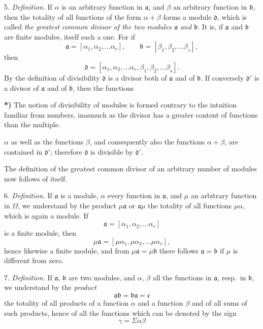 \documentclass{article}
\begin{document}
5. \emph{Definition.} If $\alpha$ is an arbitrary function in $\mathfrak{a}$, and $\beta$ an arbitrary function in $\mathfrak{b}$, then the totality of all functions of the form $\alpha + \beta$ forms a module $\mathfrak{d}$, which is called \emph{the greatest common divisor of the two modules $\mathfrak{a}$ and $\mathfrak{b}$}. It is, if $\mathfrak{a}$ and $\mathfrak{b}$ are finite modules, itself such a one. For if
\[ \mathfrak{a} = [\alpha_{1}, \alpha_{2}, \ldots \alpha_{r}], \qquad \mathfrak{b} = [\beta_{1}, \beta_{2}, \ldots \beta_{s}], \]
then
\[ \mathfrak{d} = [\alpha_{1}, \alpha_{2}, \ldots \alpha_{r}, \beta_{1}, \beta_{2}, \ldots \beta_{s}]. \]
By the definition of divisibility $\mathfrak{d}$ is a divisor both of $\mathfrak{a}$ and of $\mathfrak{b}$. If conversely $\mathfrak{d}'$ is a divisor of $\mathfrak{a}$ and of $\mathfrak{b}$, then the functions

\textbf{*)} The notion of divisibility of modules is formed contrary to the intuition familiar from numbers, inasmuch as the divisor has a greater content of functions than the multiple.

$\alpha$ as well as the functions $\beta$, and consequently also the functions $\alpha + \beta$, are contained in $\mathfrak{d}'$; therefore $\mathfrak{d}$ is divisible by $\mathfrak{d}'$.

The definition of the greatest common divisor of an arbitrary number of modules now follows of itself.

6. \emph{Definition.} If $\mathfrak{a}$ is a module, $\alpha$ every function in $\mathfrak{a}$, and $\mu$ an arbitrary function in $\Omega$, we understand by the product $\mu\mathfrak{a}$ or $\mathfrak{a}\mu$ the totality of all functions $\mu\alpha$, which is again a module. If
\[ \mathfrak{a} = [\alpha_{1}, \alpha_{2}, \ldots \alpha_{r}] \]
is a finite module, then
\[ \mu\mathfrak{a} = [\mu\alpha_{1}, \mu\alpha_{2}, \ldots \mu\alpha_{r}], \]
hence likewise a finite module, and from $\mu\mathfrak{a} = \mu\mathfrak{b}$ there follows $\mathfrak{a} = \mathfrak{b}$ if $\mu$ is different from zero.

7. \emph{Definition.} If $\mathfrak{a}$, $\mathfrak{b}$ are two modules, and $\alpha$, $\beta$ all the functions in $\mathfrak{a}$, resp.\ in $\mathfrak{b}$, we understand by the \emph{product}
\[ \mathfrak{a}\mathfrak{b} = \mathfrak{b}\mathfrak{a} = \mathfrak{c} \]
the totality of all products of a function $\alpha$ and a function $\beta$ and of all sums of such products, hence of all the functions which can be denoted by the sign
\[ \gamma = \Sigma\alpha\beta \]
\end{document}
